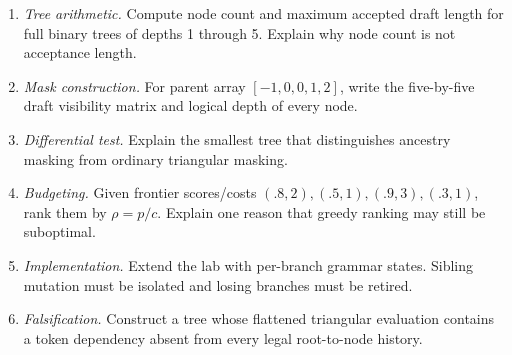 \ExercisesSection
\begin{enumerate}
\item \emph{Tree arithmetic.} Compute node count and maximum accepted draft length for
full binary trees of depths 1 through 5. Explain why node count is not acceptance length.
\item \emph{Mask construction.} For parent array $[-1,0,0,1,2]$, write the five-by-five
draft visibility matrix and logical depth of every node.
\item \emph{Differential test.} Explain the smallest tree that distinguishes ancestry
masking from ordinary triangular masking.
\item \emph{Budgeting.} Given frontier scores/costs $(.8,2),(.5,1),(.9,3),(.3,1)$,
rank them by $\rho=p/c$. Explain one reason that greedy ranking may still be suboptimal.
\item \emph{Implementation.} Extend the lab with per-branch grammar states. Sibling
mutation must be isolated and losing branches must be retired.
\item \emph{Falsification.} Construct a tree whose flattened triangular evaluation
contains a token dependency absent from every legal root-to-node history.
\end{enumerate}


